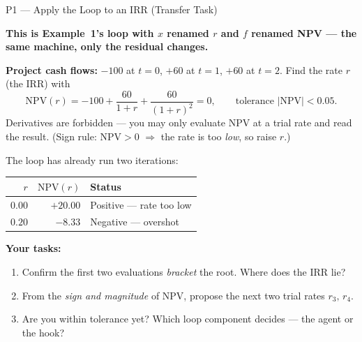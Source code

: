 \documentclass[9pt,t]{beamer}
\begin{document}
\begin{frame}{P1 --- Apply the Loop to an IRR (Transfer Task)}

\textbf{This is Example~1's loop with $x$ renamed $r$ and $f$ renamed NPV ---
the same machine, only the residual changes.}

\medskip
\textbf{Project cash flows:} $-100$ at $t=0$, $+60$ at $t=1$, $+60$ at $t=2$.
Find the rate $r$ (the IRR) with
\[
  \mathrm{NPV}(r) = -100 + \frac{60}{1+r} + \frac{60}{(1+r)^2} = 0,
  \qquad \text{tolerance } |\mathrm{NPV}|<0.05 .
\]
Derivatives are \alert{forbidden} --- you may only evaluate NPV at a trial rate
and read the result. (Sign rule: $\mathrm{NPV}>0$ $\Rightarrow$ the rate is too
\emph{low}, so raise $r$.)

\medskip
The loop has already run two iterations:

\begin{table}
\centering
\begin{tabular}{@{}rrl@{}}
\toprule
$r$ & $\mathrm{NPV}(r)$ & Status \\
\midrule
$0.00$ & $+20.00$ & Positive --- rate too low \\
$0.20$ & $-8.33$ & Negative --- overshot \\
\bottomrule
\end{tabular}
\end{table}

\medskip
\textbf{Your tasks:}
\begin{enumerate}
  \item Confirm the first two evaluations \emph{bracket} the root. Where does the
        IRR lie?
  \item From the \emph{sign and magnitude} of NPV, propose the next two trial
        rates $r_3,\,r_4$.
  \item Are you within tolerance yet? Which loop component decides --- the agent or
        the hook?
\end{enumerate}
\end{frame}
\end{document}

